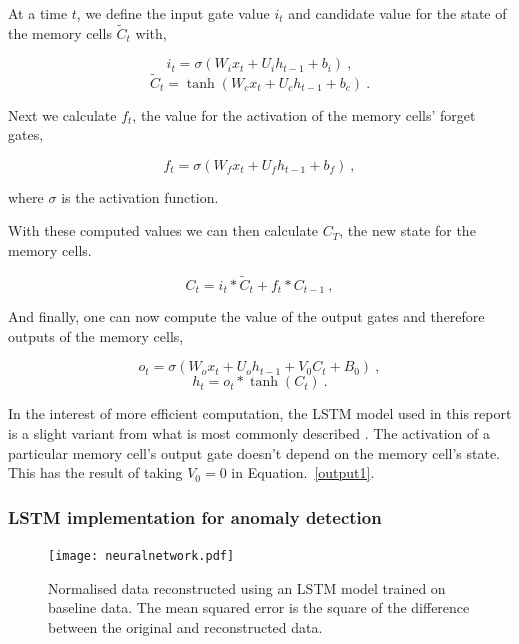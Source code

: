 At a time $t$, we define the input gate value $i_t$ and candidate value for the state of the memory cells $\widetilde{C}_t$ with,

\begin{equation}
    i_t = \sigma(W_i x_t + U_i h_{t-1} + b_i)~,
\end{equation}
\begin{equation}
    \widetilde{C}_t = \tanh(W_c x_t + U_c h_{t-1} + b_c)~.
\end{equation}

Next we calculate $f_t$, the value for the activation of the memory cells' forget gates,

\begin{equation}
    f_t = \sigma (W_f x_t + U_f h_{t-1} +b_f)~,
\end{equation}

where $\sigma$ is the activation function.

With these computed values we can then calculate $C_T$, the new state for the memory cells.

\begin{equation}
    C_t = i_t * \widetilde{C}_t + f_t * C_{t-1}~,
\end{equation}

And finally, one can now compute the value of the output gates and therefore outputs of the memory cells,

\begin{equation}
   o_t = \sigma(W_o x_t + U_o h_{t-1} + V_0 C_t + B_0)~,
   \label{output1}
\end{equation}
\begin{equation}
    h_t = o_t * \tanh(C_t)~.
\end{equation}

In the interest of more efficient computation, the LSTM model used in this report is a slight variant from what is most commonly described \cite{Graves2012}. The activation of a particular memory cell's output gate doesn't depend on the memory cell's state. This has the result of taking $V_0 = 0$ in Equation.~\eqref{output1}.

\subsubsection{LSTM implementation for anomaly detection}

\begin{figure}[t]
    \centering
    \texttt{[image: neuralnetwork.pdf]}
    \caption[Neural Network]{Normalised data reconstructed using an LSTM model trained on baseline data. The mean squared error is the square of the difference between the original and reconstructed data.}
    \label{fig:neuralnet}
\end{figure}

